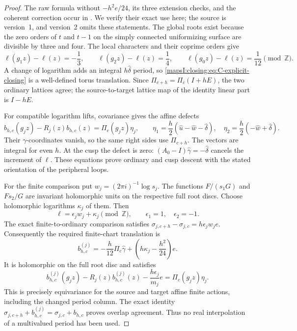 \begin{proof}
The raw formula without \(-h^2e/24\), its three extension checks,
and the coherent correction occur in
\cite[\texttt{p2:prop:global-even-shift} and the subsequent
orbit-groupoid calculations]{DGKXv1push}. We verify their exact use
here; the source is version~1, and version~2 omits these statements.
The global roots exist because the zero orders of \(t\) and \(t-1\)
on the simply connected uniformizing surface are divisible by three
and four. The local characters and their coprime orders give
\[
 \ell(g_1z)-\ell(z)=-\frac13,\qquad
 \ell(g_2z)-\ell(z)=\frac14,\qquad
 \ell(g_0z)-\ell(z)=\frac1{12}\pmod{\mathbb Z}.
\]
A change of logarithm adds an integral \(h\widehat\delta\) period,
so \eqref{mapsI:closing:eq:C-explicit-closing} is a well-defined torus translation.
Since \(\Pi_{c+h}=\Pi_c(I+hE)\), the two ordinary lattices agree;
the source-to-target lattice map of the identity linear part is
\(I-hE\).

For compatible logarithm lifts, covariance gives the affine defects
\[
 b_{h,c}(g_jz)-R_j(z)b_{h,c}(z)
       =\Pi_c(g_jz)\eta_j,\qquad
 \eta_1=\frac h2(\widehat u-\widehat w-\widehat\delta),\quad
 \eta_2=\frac h2(-\widehat w+\widehat\delta).
\]
Their \(\gamma\)-coordinates vanish, so the same right sides use
\(\Pi_{c+h}\). The vectors are integral for even \(h\). At the
cusp the defect is zero: \((A_0-I)\widehat\gamma=-\widehat\delta\)
cancels the increment of \(\ell\). These equations prove ordinary
and cusp descent with the stated orientation of the peripheral
loops.

For the finite comparison put \(w_j=(2\pi i)^{-1}\log s_j\).
The functions \(F/(s_1G)\) and \(Fs_2/G\) are invariant
holomorphic units on the respective full root discs. Choose
holomorphic logarithms \(\kappa_j\) of them. Then
\[
 \ell=\epsilon_jw_j+\kappa_j\pmod{\mathbb Z},\qquad
 \epsilon_1=1,\quad\epsilon_2=-1.
\]
The exact finite-to-ordinary comparison satisfies
\(\sigma_{j,c+h}-\sigma_{j,c}=h\epsilon_jw_je\).
Consequently the required finite-chart translation is
\[
 b^{(j)}_{h,c}
 =-\frac h{12}\Pi_c\widehat\gamma
       +\left(h\kappa_j-\frac{h^2}{24}\right)e.
\]
It is holomorphic on the full root disc and satisfies
\[
 b^{(j)}_{h,c}(g_jz)-R_j(z)b^{(j)}_{h,c}(z)
       -\frac{h\epsilon_j}{m_j}e
 =\Pi_c(g_jz)\eta_j.
\]
This is precisely equivariance for the source and target affine
finite actions, including the changed period column. The exact
identity
\(\sigma_{j,c+h}+b^{(j)}_{h,c}
=\sigma_{j,c}+b_{h,c}\) proves overlap agreement. Thus no real
interpolation of a multivalued period has been used.


\end{proof}
